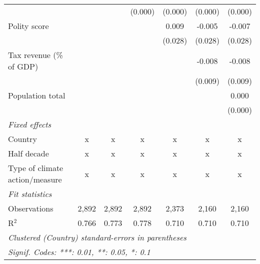 \begin{tabular}{lcccccc}
                                                                                    &         &               & (0.000)       & (0.000)       & (0.000)       & (0.000)\\   
   Polity score                                                                     &         &               &               & 0.009         & -0.005        & -0.007\\   
                                                                                    &         &               &               & (0.028)       & (0.028)       & (0.028)\\   
   Tax revenue (\% of GDP)                                                          &         &               &               &               & -0.008        & -0.008\\   
                                                                                    &         &               &               &               & (0.009)       & (0.009)\\   
   Population total                                                                 &         &               &               &               &               & 0.000\\   
                                                                                    &         &               &               &               &               & (0.000)\\   
   \emph{Fixed effects}\\
   Country                                                                          & x       & x             & x             & x             & x             & x\\  
   Half decade                                                                      & x       & x             & x             & x             & x             & x\\  
   Type of climate action/measure                                                   & x       & x             & x             & x             & x             & x\\  
   \midrule \emph{Fit statistics}\\
   Observations                                                                     & 2,892   & 2,892         & 2,892         & 2,373         & 2,160         & 2,160\\  
   R$^2$                                                                            & 0.766   & 0.773         & 0.778         & 0.710         & 0.710         & 0.710\\  
   \midrule
   \multicolumn{7}{l}{\emph{Clustered (Country) standard-errors in parentheses}}\\
   \multicolumn{7}{l}{\emph{Signif. Codes: ***: 0.01, **: 0.05, *: 0.1}}\\
\end{tabular}
\par\endgroup


